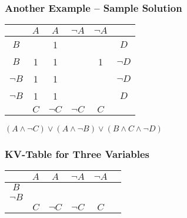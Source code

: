 \documentclass{beamer}
\theoremstyle{remark}
\begin{document}
\begin{frame}
	\frametitle{Another Example -- Sample Solution}
	\pause
	
	\begin{center}
	\begin{tabular}{c|c|c|c|c|c}
	 & $A$ & $A$ & $\lnot A$ & $\lnot A$ & \\ \hline
	$B$ & & 1 & & & $D$ \\ \hline
	$B$ & 1 & 1 & & 1 & $\lnot D$ \\ \hline
	$\lnot B$ & 1 & 1 & & & $\lnot D$ \\ \hline
	$\lnot B$ & 1 & 1 & & & $D$ \\ \hline
	 & $C$ & $\lnot C$ & $\lnot C$ & $C$ &
	\end{tabular}
	\end{center}
	
	\vspace{1.5em}
	
	$(A \land \lnot C) \lor (A \land \lnot B) \lor (B \land C \land \lnot D)$
\end{frame}

\begin{frame}
	\frametitle{KV-Table for Three Variables}
	
	\begin{center}
	\begin{tabular}{c|c|c|c|c|c}
	 & $A$ & $A$ & $\lnot A$ & $\lnot A$ & \\ \hline
	 $B$ & &&&& \\ \hline
	 $\lnot B$ &&&&& \\ \hline
	  & $C$ & $\lnot C$ & $\lnot C$ & $C$ &
	
	\end{tabular}
	\end{center}
\end{frame}
\end{document}
